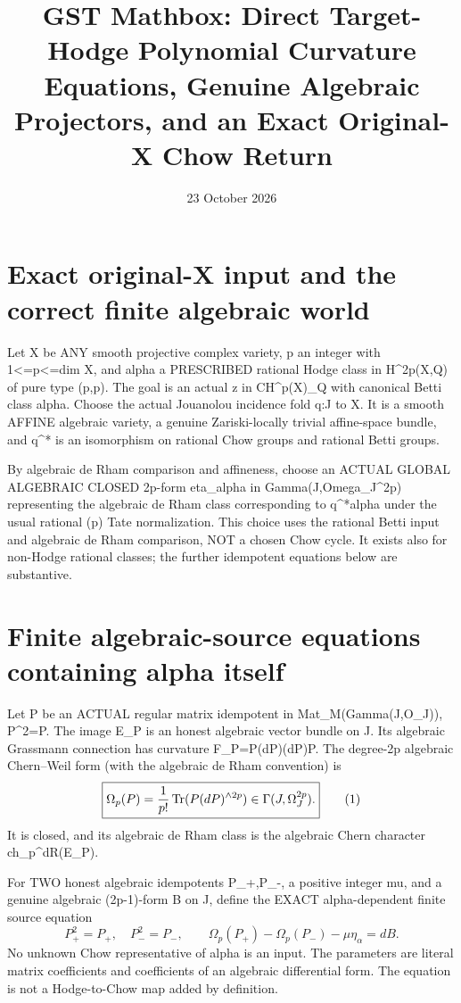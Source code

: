 \documentclass[11pt]{article}
\title{GST Mathbox: Direct Target-Hodge Polynomial Curvature Equations, Genuine Algebraic Projectors, and an Exact Original-X Chow Return}
\date{23 October 2026}
\begin{document}
\maketitle
\section{Exact original-X input and the correct finite algebraic world}
Let X be ANY smooth projective complex variety, p an integer with
1<=p<=dim X, and alpha a PRESCRIBED rational Hodge class
in H^{2p}(X,Q) of pure type (p,p).
The goal is an actual z in CH^p(X)_Q with canonical Betti class alpha.
Choose the actual Jouanolou incidence fold q:J to X.
It is a smooth AFFINE algebraic variety, a genuine
Zariski-locally trivial affine-space bundle, and
q^* is an isomorphism on rational Chow groups
and rational Betti groups.

By algebraic de Rham comparison and affineness,
choose an ACTUAL GLOBAL ALGEBRAIC CLOSED 2p-form
eta_alpha in Gamma(J,Omega_J^{2p}) representing
the algebraic de Rham class corresponding to q^*alpha
under the usual rational (p) Tate normalization.
This choice uses the rational Betti input and algebraic
de Rham comparison, NOT a chosen Chow cycle.
It exists also for non-Hodge rational classes;
the further idempotent equations below are substantive.

\section{Finite algebraic-source equations containing alpha itself}
Let P be an ACTUAL regular matrix idempotent
in Mat_M(Gamma(J,O_J)), P^2=P.
The image E_P is an honest algebraic vector bundle
on J. Its algebraic Grassmann connection has curvature
F_P=P(dP)\wedge(dP)P. The degree-2p algebraic
Chern--Weil form (with the algebraic de Rham convention) is
\[
 \boxed{\Omega_p(P)={1\over p!}
       \operatorname{Tr}(P(dP)^{\wedge 2p})
       \in\Gamma(J,\Omega_J^{2p}).}             \tag{1}
\]
It is closed, and its algebraic de Rham class is
the algebraic Chern character ch_p^{dR}(E_P).

For TWO honest algebraic idempotents P_+,P_-,
a positive integer mu, and a genuine algebraic
(2p-1)-form B on J,
define the EXACT alpha-dependent finite source equation
\[
 \boxed{
 P_+^2=P_+,\quad P_-^2=P_-,
 \qquad
 \Omega_p(P_+)-\Omega_p(P_-)-\mu\eta_\alpha=dB .
 }                                                     \tag{2}
\]
No unknown Chow representative of alpha is an input.
The parameters are literal matrix coefficients and
coefficients of an algebraic differential form.
The equation is not a Hodge-to-Chow map added by definition.
\end{document}
